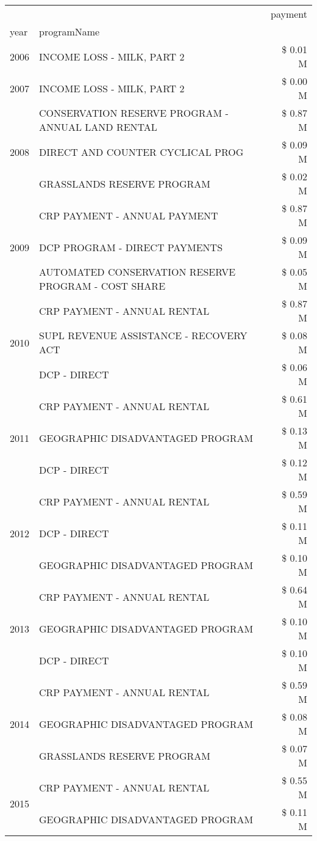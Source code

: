 \begin{tabular}{llr}
\toprule
 &  & payment \\
year & programName &  \\
\midrule
2006 & INCOME LOSS - MILK, PART 2 & \$ 0.01 M \\
\cline{1-3}
2007 & INCOME LOSS - MILK, PART 2 & \$ 0.00 M \\
\cline{1-3}
\multirow[t]{3}{*}{2008} & CONSERVATION RESERVE PROGRAM - ANNUAL LAND RENTAL & \$ 0.87 M \\
 & DIRECT AND COUNTER CYCLICAL PROG & \$ 0.09 M \\
 & GRASSLANDS RESERVE PROGRAM & \$ 0.02 M \\
\cline{1-3}
\multirow[t]{3}{*}{2009} & CRP PAYMENT - ANNUAL PAYMENT & \$ 0.87 M \\
 & DCP PROGRAM - DIRECT PAYMENTS & \$ 0.09 M \\
 & AUTOMATED CONSERVATION RESERVE PROGRAM - COST SHARE & \$ 0.05 M \\
\cline{1-3}
\multirow[t]{3}{*}{2010} & CRP PAYMENT - ANNUAL RENTAL & \$ 0.87 M \\
 & SUPL REVENUE ASSISTANCE - RECOVERY ACT & \$ 0.08 M \\
 & DCP - DIRECT & \$ 0.06 M \\
\cline{1-3}
\multirow[t]{3}{*}{2011} & CRP PAYMENT - ANNUAL RENTAL & \$ 0.61 M \\
 & GEOGRAPHIC DISADVANTAGED PROGRAM & \$ 0.13 M \\
 & DCP - DIRECT & \$ 0.12 M \\
\cline{1-3}
\multirow[t]{3}{*}{2012} & CRP PAYMENT - ANNUAL RENTAL & \$ 0.59 M \\
 & DCP - DIRECT & \$ 0.11 M \\
 & GEOGRAPHIC DISADVANTAGED PROGRAM & \$ 0.10 M \\
\cline{1-3}
\multirow[t]{3}{*}{2013} & CRP PAYMENT - ANNUAL RENTAL & \$ 0.64 M \\
 & GEOGRAPHIC DISADVANTAGED PROGRAM & \$ 0.10 M \\
 & DCP - DIRECT & \$ 0.10 M \\
\cline{1-3}
\multirow[t]{3}{*}{2014} & CRP PAYMENT - ANNUAL RENTAL & \$ 0.59 M \\
 & GEOGRAPHIC DISADVANTAGED PROGRAM & \$ 0.08 M \\
 & GRASSLANDS RESERVE PROGRAM & \$ 0.07 M \\
\cline{1-3}
\multirow[t]{3}{*}{2015} & CRP PAYMENT - ANNUAL RENTAL & \$ 0.55 M \\
 & GEOGRAPHIC DISADVANTAGED PROGRAM & \$ 0.11 M \\

\end{tabular}
